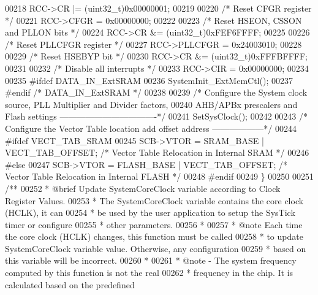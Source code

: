 \begin{DoxyCode}
00218   RCC->CR |= (uint32\_t)0x00000001;
00219 
00220   \textcolor{comment}{/* Reset CFGR register */}
00221   RCC->CFGR = 0x00000000;
00222 
00223   \textcolor{comment}{/* Reset HSEON, CSSON and PLLON bits */}
00224   RCC->CR &= (uint32\_t)0xFEF6FFFF;
00225 
00226   \textcolor{comment}{/* Reset PLLCFGR register */}
00227   RCC->PLLCFGR = 0x24003010;
00228 
00229   \textcolor{comment}{/* Reset HSEBYP bit */}
00230   RCC->CR &= (uint32\_t)0xFFFBFFFF;
00231 
00232   \textcolor{comment}{/* Disable all interrupts */}
00233   RCC->CIR = 0x00000000;
00234 
00235 \textcolor{preprocessor}{#}\textcolor{preprocessor}{ifdef} \textcolor{preprocessor}{DATA\_IN\_ExtSRAM}
00236   SystemInit\_ExtMemCtl();
00237 \textcolor{preprocessor}{#}\textcolor{preprocessor}{endif} \textcolor{comment}{/* DATA\_IN\_ExtSRAM */}
00238 
00239   \textcolor{comment}{/* Configure the System clock source, PLL Multiplier and Divider factors, }
00240 \textcolor{comment}{     AHB/APBx prescalers and Flash settings ----------------------------------*/}
00241   SetSysClock();
00242 
00243   \textcolor{comment}{/* Configure the Vector Table location add offset address ------------------*/}
00244 \textcolor{preprocessor}{#}\textcolor{preprocessor}{ifdef} \textcolor{preprocessor}{VECT\_TAB\_SRAM}
00245   SCB->VTOR = SRAM\_BASE | VECT\_TAB\_OFFSET; \textcolor{comment}{/* Vector Table Relocation in Internal SRAM */}
00246 \textcolor{preprocessor}{#}\textcolor{preprocessor}{else}
00247   SCB->VTOR = FLASH_BASE | VECT_TAB_OFFSET; \textcolor{comment}{/* Vector Table Relocation in Internal FLASH */}
00248 \textcolor{preprocessor}{#}\textcolor{preprocessor}{endif}
00249 \}
00250 
00251 \textcolor{comment}{/**}
00252 \textcolor{comment}{   * @brief  Update SystemCoreClock variable according to Clock Register Values.}
00253 \textcolor{comment}{  *         The SystemCoreClock variable contains the core clock (HCLK), it can}
00254 \textcolor{comment}{  *         be used by the user application to setup the SysTick timer or configure}
00255 \textcolor{comment}{  *         other parameters.}
00256 \textcolor{comment}{  *           }
00257 \textcolor{comment}{  * @note   Each time the core clock (HCLK) changes, this function must be called}
00258 \textcolor{comment}{  *         to update SystemCoreClock variable value. Otherwise, any configuration}
00259 \textcolor{comment}{  *         based on this variable will be incorrect.         }
00260 \textcolor{comment}{  *     }
00261 \textcolor{comment}{  * @note   - The system frequency computed by this function is not the real }
00262 \textcolor{comment}{  *           frequency in the chip. It is calculated based on the predefined }

\end{DoxyCode}
